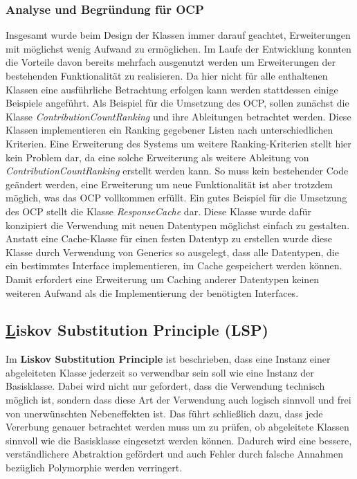 \subsubsection{Analyse und Begründung für OCP}
Insgesamt wurde beim Design der Klassen immer darauf geachtet, Erweiterungen mit möglichst wenig Aufwand zu ermöglichen.
Im Laufe der Entwicklung konnten die Vorteile davon bereits mehrfach ausgenutzt werden um Erweiterungen der bestehenden Funktionalität zu realisieren.
Da hier nicht für alle enthaltenen Klassen eine ausführliche Betrachtung erfolgen kann werden stattdessen einige Beispiele angeführt.
\label{sec:OCP_Strategy}
Als Beispiel für die Umsetzung des OCP, sollen zunächst die Klasse \textit{ContributionCountRanking} und ihre Ableitungen betrachtet werden.
Diese Klassen implementieren ein Ranking gegebener Listen nach unterschiedlichen Kriterien.
Eine Erweiterung des Systems um weitere Ranking-Kriterien stellt hier kein Problem dar, da eine solche Erweiterung als weitere Ableitung von \textit{ContributionCountRanking} erstellt werden kann.
So muss kein bestehender Code geändert werden, eine Erweiterung um neue Funktionalität ist aber trotzdem möglich, was das OCP vollkommen erfüllt.
\newline
Ein gutes Beispiel für die Umsetzung des OCP stellt die Klasse \textit{ResponseCache} dar. 
Diese Klasse wurde dafür konzipiert die Verwendung mit neuen Datentypen möglichst einfach zu gestalten.
Anstatt eine Cache-Klasse für einen festen Datentyp zu erstellen wurde diese Klasse durch Verwendung von Generics so ausgelegt, dass alle Datentypen, die ein bestimmtes Interface implementieren, im Cache gespeichert werden können.
Damit erfordert eine Erweiterung um Caching anderer Datentypen keinen weiteren Aufwand als die Implementierung der benötigten Interfaces.



\newpage
\subsection{\underline{L}iskov Substitution Principle (LSP)}

Im \textbf{Liskov Substitution Principle} ist beschrieben, dass eine Instanz einer abgeleiteten Klasse jederzeit so verwendbar sein soll wie eine Instanz der Basisklasse.
Dabei wird nicht nur gefordert, dass die Verwendung technisch möglich ist, sondern dass diese Art der Verwendung auch logisch sinnvoll und frei von unerwünschten Nebeneffekten ist.
Das führt schließlich dazu, dass jede Vererbung genauer betrachtet werden muss um zu prüfen, ob abgeleitete Klassen sinnvoll wie die Basisklasse eingesetzt werden können.
Dadurch wird eine bessere, verständlichere Abstraktion gefördert und auch Fehler durch falsche Annahmen bezüglich Polymorphie werden verringert.


